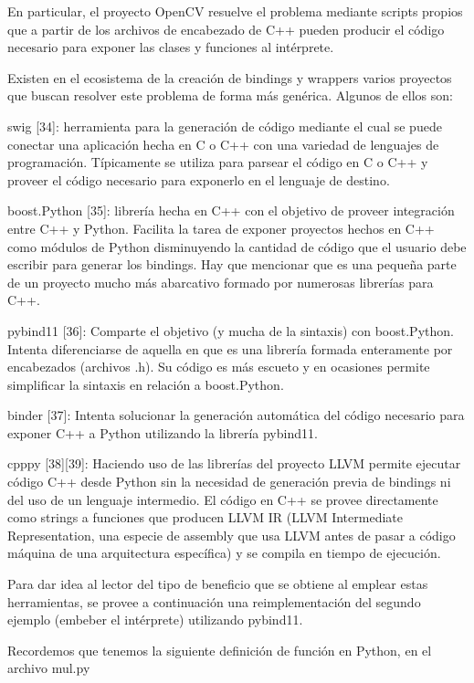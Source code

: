 \documentclass[]{article}
\begin{document}
En particular, el proyecto OpenCV resuelve el problema mediante scripts propios
que a partir de los archivos de encabezado de C++ pueden producir el código
necesario para exponer las clases y funciones al intérprete. 

Existen en el ecosistema de la creación de bindings y wrappers varios proyectos
que buscan resolver este problema de forma más genérica. Algunos de ellos son:

swig [34]: herramienta para la generación de código mediante el cual se puede
conectar una aplicación hecha en C o C++ con una variedad de lenguajes de
programación. Típicamente se utiliza para parsear el código en C o C++ y
proveer el código necesario para exponerlo en el lenguaje de destino.

boost.Python [35]: librería hecha en C++ con el objetivo de proveer integración
entre C++ y Python. Facilita la tarea de exponer proyectos hechos en C++ como
módulos de Python disminuyendo la cantidad de código que el usuario debe
escribir para generar los bindings. Hay que mencionar que es una pequeña parte
de un proyecto mucho más abarcativo formado por numerosas librerías para C++.

pybind11 [36]: Comparte el objetivo (y mucha de la sintaxis) con boost.Python.
Intenta diferenciarse de aquella en que es una librería formada enteramente por
encabezados (archivos .h). Su código es más escueto y en ocasiones permite
simplificar la sintaxis en relación a boost.Python. 

binder [37]: Intenta solucionar la generación automática del código necesario
para exponer C++ a Python utilizando la librería pybind11.

cpppy [38][39]: Haciendo uso de las librerías del proyecto LLVM permite
ejecutar código C++ desde Python sin la necesidad de generación previa de
bindings ni del uso de un lenguaje intermedio. El código en C++ se provee
directamente como strings a funciones que producen LLVM IR (LLVM Intermediate
Representation, una especie de assembly que usa LLVM antes de pasar a código
máquina de una arquitectura específica) y se compila en tiempo de ejecución.

Para dar idea al lector del tipo de beneficio que se obtiene al emplear estas
herramientas, se provee a continuación una reimplementación del segundo ejemplo
(embeber el intérprete) utilizando pybind11.

Recordemos que tenemos la siguiente definición de función en Python, en el
archivo mul.py

\inputminted{Python}{codelistings/multiply.py}
\end{document}
